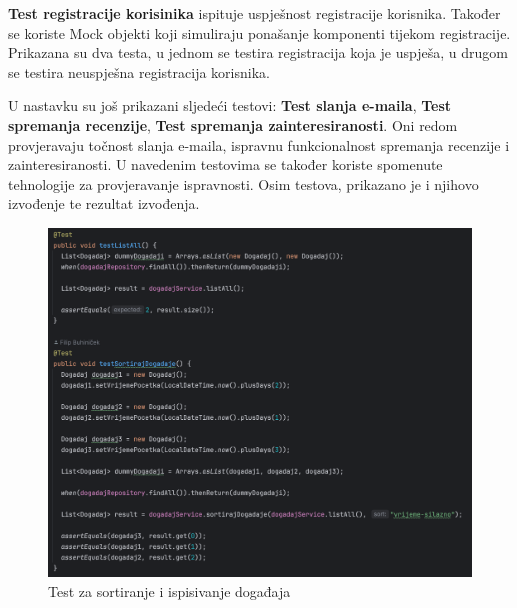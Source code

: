 			\textbf{Test registracije korisinika} ispituje uspješnost registracije korisnika. Također se koriste Mock objekti koji simuliraju ponašanje komponenti tijekom registracije. Prikazana su dva testa, u jednom se testira registracija koja je uspješa, u drugom se testira neuspješna registracija korisnika.

			U nastavku su još prikazani sljedeći testovi: \textbf{Test slanja e-maila}, \textbf{Test spremanja recenzije}, \textbf{Test spremanja zainteresiranosti}. Oni redom provjeravaju točnost slanja e-maila, ispravnu funkcionalnost spremanja recenzije i zainteresiranosti. U navedenim testovima se također koriste spomenute tehnologije za provjeravanje ispravnosti. Osim testova, prikazano je i njihovo izvođenje te rezultat izvođenja.
			
			\begin{figure}[H]
				\includegraphics[scale=0.45]{testovi/dogadajTest.png}
				\centering
				\caption{Test za sortiranje i ispisivanje događaja}
				\label{fig:promjene}
			\end{figure}
			
